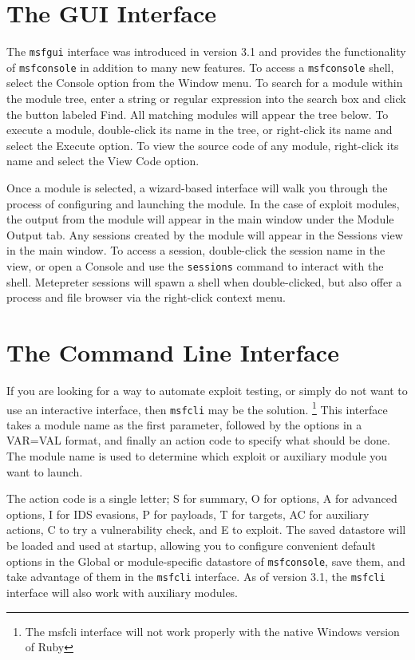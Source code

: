 \documentclass{report}
\begin{document}
    \section{The GUI Interface}
    \label{STARTED-GUI}

\par
The \texttt{msfgui} interface was introduced in version 3.1 and provides the functionality
of \texttt{msfconsole} in addition to many new features. To access a \texttt{msfconsole}
shell, select the Console option from the Window menu. To search for a module within the
module tree, enter a string or regular expression into the search box and click the button
labeled Find. All matching modules will appear the tree below. To execute a module, 
double-click its name in the tree, or right-click its name and select the Execute option.
To view the source code of any module, right-click its name and select the View Code option.

\par
Once a module is selected, a wizard-based interface will walk you through the process of
configuring and launching the module. In the case of exploit modules, the output from
the module will appear in the main window under the Module Output tab. Any sessions created
by the module will appear in the Sessions view in the main window. To access a session,
double-click the session name in the view, or open a Console and use the \texttt{sessions}
command to interact with the shell. Metepreter sessions will spawn a shell when double-clicked,
but also offer a process and file browser via the right-click context menu. 


    \section{The Command Line Interface}
    \label{STARTED-CLI}

\par
If you are looking for a way to automate exploit testing, or simply do not want
to use an interactive interface, then \texttt{msfcli} may be the solution.
\footnote{The msfcli interface will not work properly with the native Windows version of Ruby}
This interface takes a module name as the first parameter, followed by the options
in a VAR=VAL format, and finally an action code to specify what should be done.
The module name is used to determine which exploit or auxiliary module you
want to launch.

\par
The action code is a single letter; S for summary, O for options, A for advanced
options, I for IDS evasions, P for payloads, T for targets, AC for auxiliary
actions, C to try a vulnerability check, and E to exploit. The saved
datastore will be loaded and used at startup, allowing you to configure
convenient default options in the Global or module-specific datastore of
\texttt{msfconsole}, save them, and take advantage of them in the
\texttt{msfcli} interface. As of version 3.1, the \texttt{msfcli} interface
will also work with auxiliary modules.
\end{document}
